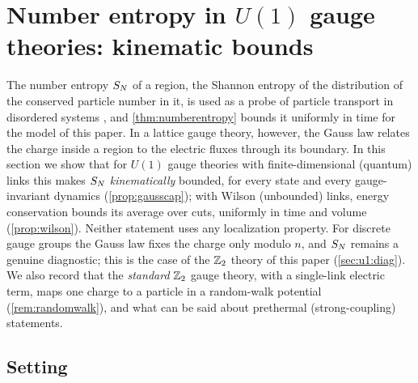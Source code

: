 \providecommand{\Ush}{\mathrm{H}}            %
\providecommand{\Uodd}{o}                    %
\providecommand{\UQ}{\mathsf{Q}}             %
\providecommand{\sxb}[1]{\sigma^{x}_{b_{#1}}}
\providecommand{\szb}[1]{\sigma^{z}_{b_{#1}}}
\providecommand{\taux}[1]{\tau^{x}_{#1}}

\section{Number entropy in \texorpdfstring{$U(1)$}{U(1)} gauge theories: kinematic bounds}\label{sec:u1}

The number entropy $S_{N}$ of a region, the Shannon entropy of the distribution of the conserved particle number
in it, is used as a probe of particle transport in disordered systems \cite{Lukin2019,KUFS2020}, and
\cref{thm:numberentropy} bounds it uniformly in time for the model of this paper.  In a lattice gauge theory,
however, the Gauss law relates the charge inside a region to the electric fluxes through its boundary.  In this
section we show that for $U(1)$ gauge theories with finite-dimensional (quantum) links this makes $S_{N}$
\emph{kinematically} bounded, for every state and every gauge-invariant dynamics (\cref{prop:gausscap}); with
Wilson (unbounded) links, energy conservation bounds its average over cuts, uniformly in time and volume
(\cref{prop:wilson}).  Neither statement uses any localization property.  For discrete gauge groups the
Gauss law fixes the charge only modulo $n$, and $S_{N}$ remains a genuine diagnostic; this is the case of the
$\mathbb{Z}_2$ theory of this paper (\cref{sec:u1:diag}).  We also record that the \emph{standard} $\mathbb{Z}_2$ gauge theory,
with a single-link electric term, maps one charge to a particle in a random-walk potential
(\cref{rem:randomwalk}), and what can be said about prethermal (strong-coupling) statements.

\subsection{Setting}\label{sec:u1:setting}

